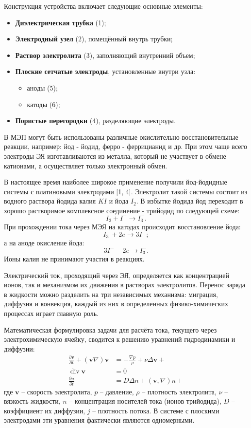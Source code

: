 \documentclass[12pt, a4paper]{article}
\begin{document}
Конструкция устройства включает следующие основные элементы:
\begin{itemize}[label=--]
    \item \textbf{Диэлектрическая трубка} (1);
    \item \textbf{Электродный узел} (2), помещённый внутрь трубки;
    \item \textbf{Раствор электролита} (3), заполняющий внутренний объем;
    \item \textbf{Плоские сетчатые электроды}, установленные внутри узла:
    \begin{itemize}
        \item аноды (5);
        \item катоды (6);
    \end{itemize}
    \item \textbf{Пористые перегородки} (4), разделяющие электроды.
\end{itemize}
В МЭП могут быть использованы различные окислительно-восстановительные реакции, например: йод - йодид, ферро - феррицианид и др. При этом чаще всего электроды ЭЯ изготавливаются из металла, который не участвует в обмене катионами, а осуществляет только электронный обмен.

В настоящее время наиболее широкое применение получили йод-йодидные системы с платиновыми электродами [1, 4]. Электролит такой системы состоит из водного раствора йодида калия $KI$ и йода $I_2$. В избытке йодида йод переходит в хорошо растворимое комплексное соединение - трийодид по следующей схеме:
\[
I_2 + I^- \rightarrow I_3^-.
\]
При прохождении тока через МЭЯ на катодах происходит восстановление йода:
\[
I_3^- + 2e \rightarrow 3I^-;
\]
а на аноде окисление йода:
\[
3I^- - 2e \rightarrow I_3^-.
\]
Ионы калия не принимают участия в реакциях.
\par

Электрический ток, проходящий через ЭЯ, определяется как концентрацией ионов, так и механизмом их движения в растворах электролитов. Перенос заряда в жидкости можно разделить на три независимых механизма: миграция, диффузия и конвекция, каждый из них в определенных физико-химических процессах играет главную роль.

\par

Математическая формулировка задачи для расчёта тока, текущего через электрохимическую ячейку, сводится к решению уравнений гидродинамики и диффузии:
\begin{align}
    \frac{\partial \mathbf{v}}{\partial t} + (\mathbf{v}\nabla)\mathbf{v} &= -\frac{\nabla p}{\rho} + \nu\Delta\mathbf{v} + \label{eq:1} \\
    \operatorname{div} \mathbf{v} &= 0 \label{eq:2} \\
    \frac{\partial n}{\partial t} &= D\Delta n + (\mathbf{v}, \nabla)n + \label{eq:3}
\end{align}
где $\mathbf{v}$ -- скорость электролита, $p$ -- давление, $\rho$ -- плотность электролита, $\nu$ -- вязкость жидкости, $n$ -- концентрация носителей тока (ионов трийодида), $D$ -- коэффициент их диффузии, $j$ -- плотность потока. В системе с плоскими электродами эти уравнения фактически являются одномерными.
\end{document}
